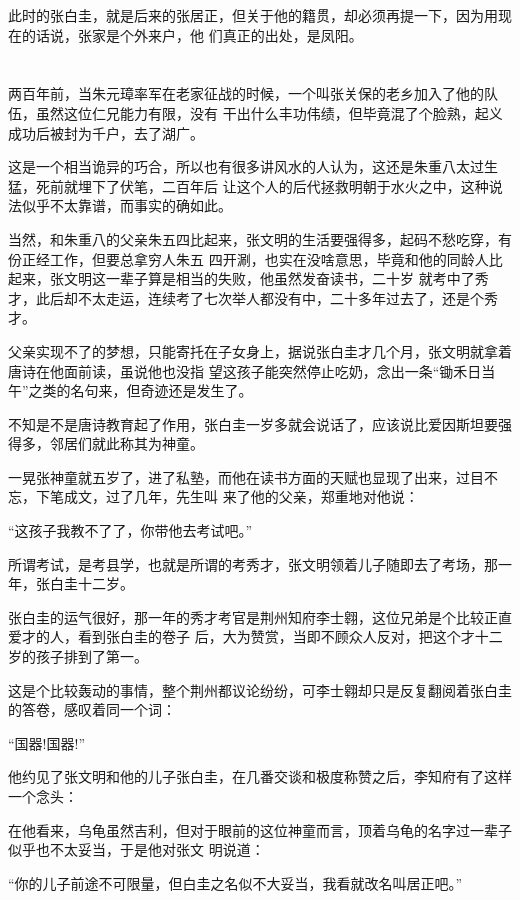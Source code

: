 \documentclass[11pt,a4paper,onecolumn]{article}
\begin{document}
此时的张白圭，就是后来的张居正，但关于他的籍贯，却必须再提一下，因为用现在的话说，张家是个外来户，他
们真正的出处，是凤阳。

\section[\thesection]{}

两百年前，当朱元璋率军在老家征战的时候，一个叫张关保的老乡加入了他的队伍，虽然这位仁兄能力有限，没有
干出什么丰功伟绩，但毕竟混了个脸熟，起义成功后被封为千户，去了湖广。

这是一个相当诡异的巧合，所以也有很多讲风水的人认为，这还是朱重八太过生猛，死前就埋下了伏笔，二百年后
让这个人的后代拯救明朝于水火之中，这种说法似乎不太靠谱，而事实的确如此。

当然，和朱重八的父亲朱五四比起来，张文明的生活要强得多，起码不愁吃穿，有份正经工作，但要总拿穷人朱五
四开涮，也实在没啥意思，毕竟和他的同龄人比起来，张文明这一辈子算是相当的失败，他虽然发奋读书，二十岁
就考中了秀才，此后却不太走运，连续考了七次举人都没有中，二十多年过去了，还是个秀才。

父亲实现不了的梦想，只能寄托在子女身上，据说张白圭才几个月，张文明就拿着唐诗在他面前读，虽说他也没指
望这孩子能突然停止吃奶，念出一条``锄禾日当午''之类的名句来，但奇迹还是发生了。

不知是不是唐诗教育起了作用，张白圭一岁多就会说话了，应该说比爱因斯坦要强得多，邻居们就此称其为神童。

一晃张神童就五岁了，进了私塾，而他在读书方面的天赋也显现了出来，过目不忘，下笔成文，过了几年，先生叫
来了他的父亲，郑重地对他说：

``这孩子我教不了了，你带他去考试吧。''

所谓考试，是考县学，也就是所谓的考秀才，张文明领着儿子随即去了考场，那一年，张白圭十二岁。

张白圭的运气很好，那一年的秀才考官是荆州知府李士翱，这位兄弟是个比较正直爱才的人，看到张白圭的卷子
后，大为赞赏，当即不顾众人反对，把这个才十二岁的孩子排到了第一。

这是个比较轰动的事情，整个荆州都议论纷纷，可李士翱却只是反复翻阅着张白圭的答卷，感叹着同一个词：

``国器!国器!''

他约见了张文明和他的儿子张白圭，在几番交谈和极度称赞之后，李知府有了这样一个念头：

在他看来，乌龟虽然吉利，但对于眼前的这位神童而言，顶着乌龟的名字过一辈子似乎也不太妥当，于是他对张文
明说道：

``你的儿子前途不可限量，但白圭之名似不大妥当，我看就改名叫居正吧。''
\end{document}
